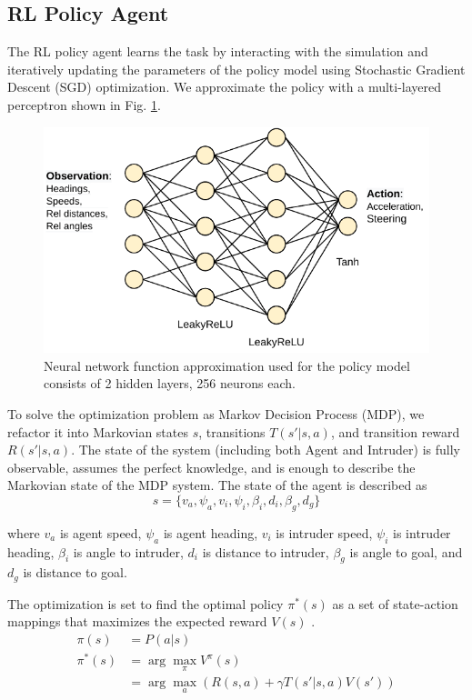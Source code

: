 \subsection{RL Policy Agent}

The RL policy agent learns the task by interacting with the simulation and iteratively updating the parameters of the policy model using Stochastic Gradient Descent (SGD) optimization. We approximate the policy with a multi-layered perceptron shown in Fig. \ref{fig:policy_model}.

\begin{figure}[h]
	\centering
	\includegraphics[width=0.8\columnwidth]{figures/model.pdf}
	\caption{Neural network function approximation used for the policy model consists of 2 hidden layers, 256 neurons each.}
	\label{fig:policy_model}
\end{figure}

To solve the optimization problem as Markov Decision Process (MDP), we refactor it into Markovian states $s$, transitions  $T(s' | s, a)$, and transition reward $R(s' | s, a)$. 
The state of the system (including both Agent and Intruder) is fully observable, assumes the perfect knowledge, and is enough to describe the Markovian state of the MDP system.
The state of the agent is described as
$$ s = \{ v_a, \psi_a, v_i, \psi_i, \beta_i, d_i, \beta_g, d_g \}$$

where 
$v_a$ is agent speed,
$\psi_a$ is agent heading,
$v_i$ is intruder speed,
$\psi_i$ is intruder heading,
$\beta_i$ is angle to intruder,
$d_i$ is distance to intruder,
$\beta_g$ is angle to goal, and
$d_g$ is distance to goal. 

The optimization is set to find the optimal policy $\pi^*(s)$ as a set of state-action mappings that maximizes the expected reward $V(s)$ \cite{sutton2018reinforcement}.
\begin{align} 
	\pi(s) &= P(a | s) \\
	\pi^*(s) &= \arg\max_{\pi} V^\pi (s) \\
	&= \arg\max_a \left( R(s,a) + \gamma T(s'|s,a) V(s') \right)
\end{align} 

